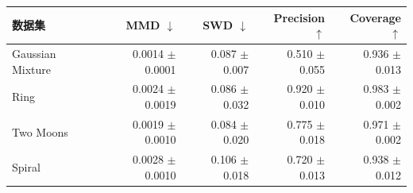\begin{tabular}{lrrrr}
\toprule
数据集 & MMD $\downarrow$ & SWD $\downarrow$ & Precision $\uparrow$ & Coverage $\uparrow$ \\
\midrule
Gaussian Mixture & 0.0014 $\pm$ 0.0001 & 0.087 $\pm$ 0.007 & 0.510 $\pm$ 0.055 & 0.936 $\pm$ 0.013 \\
Ring & 0.0024 $\pm$ 0.0019 & 0.086 $\pm$ 0.032 & 0.920 $\pm$ 0.010 & 0.983 $\pm$ 0.002 \\
Two Moons & 0.0019 $\pm$ 0.0010 & 0.084 $\pm$ 0.020 & 0.775 $\pm$ 0.018 & 0.971 $\pm$ 0.002 \\
Spiral & 0.0028 $\pm$ 0.0010 & 0.106 $\pm$ 0.018 & 0.720 $\pm$ 0.013 & 0.938 $\pm$ 0.012 \\
\bottomrule
\end{tabular}